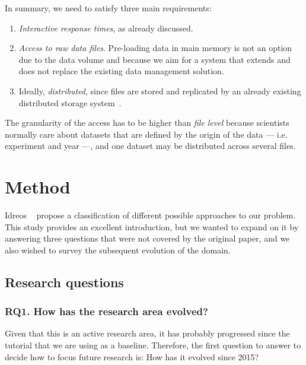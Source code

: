 
In summary, we need to satisfy three main requirements:

\begin{enumerate}
  \item \emph{Interactive response times}, as already discussed.
  \item \emph{Access to raw data files}. Pre-loading data in main memory is not an
    option due to the data volume and because we aim for a system that extends and does
    not replace the existing data management solution.
  \item Ideally, \emph{distributed}, since files are stored and replicated by an already existing
    distributed storage system~\cite{Baud2012}.
\end{enumerate}

The granularity of the access has to be higher than \emph{file level} because
scientists normally care about datasets that are defined by the origin of the data --- i.e. experiment and year ---,
and one dataset may be distributed across several files.

\section{Method}
\label{sec:mapping/method}

Idreos \etal~\cite{Idreos2015} propose a classification of different possible approaches
to our problem.
This study provides an excellent introduction, but we wanted to expand on it by answering
three questions that were not covered by the original paper, and we also wished to survey
the subsequent evolution of the domain.

\subsection{Research questions}
\label{sec:mapping/research_questions}

\subsubsection{RQ1. How has the research area evolved?}
Given that this is an active research area, it has probably progressed since
the tutorial that we are using as a baseline. Therefore, the first
question to answer to decide how to focus future research is:
How has it evolved since 2015?

